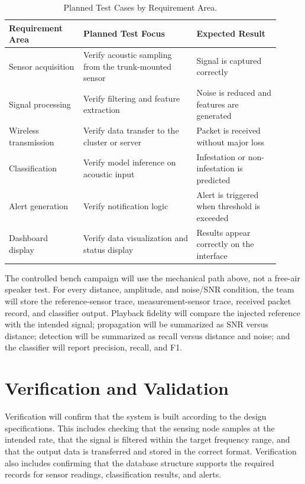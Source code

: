 \documentclass[12pt,a4paper,oneside]{memoir}
\newcommand{\newrevision}[1]{\textcolor{green!45!black}{#1}}
\begin{document}
\begin{table}[h]
\centering
\caption{Planned Test Cases by Requirement Area.}
\label{tab:testcases}
\renewcommand{\arraystretch}{1.3}
\begin{tabular}{@{} p{0.25\linewidth} p{0.38\linewidth} p{0.28\linewidth} @{}}
\toprule
\textbf{Requirement Area} & \textbf{Planned Test Focus} & \textbf{Expected Result} \\
\midrule
Sensor acquisition    & Verify acoustic sampling from the trunk-mounted sensor & Signal is captured correctly \\
Signal processing     & Verify filtering and feature extraction                & Noise is reduced and features are generated \\
Wireless transmission & Verify data transfer to the cluster or server          & Packet is received without major loss \\
Classification        & Verify model inference on acoustic input               & Infestation or non-infestation is predicted \\
Alert generation      & Verify notification logic                              & Alert is triggered when threshold is exceeded \\
Dashboard display     & Verify data visualization and status display           & Results appear correctly on the interface \\
\bottomrule
\end{tabular}
\end{table}

\newrevision{The controlled bench campaign will use the mechanical path above, not a free-air speaker test. For every distance, amplitude, and noise/SNR condition, the team will store the reference-sensor trace, measurement-sensor trace, received packet record, and classifier output. Playback fidelity will compare the injected reference with the intended signal; propagation will be summarized as SNR versus distance; detection will be summarized as recall versus distance and noise; and the classifier will report precision, recall, and F1.}

\section{Verification and Validation}
\label{sec:VandV}

Verification will confirm that the system is built according to the design specifications. This includes checking that the sensing node samples at the intended rate, that the signal is filtered within the target frequency range, and that the output data is transferred and stored in the correct format. Verification also includes confirming that the database structure supports the required records for sensor readings, classification results, and alerts.
\end{document}
